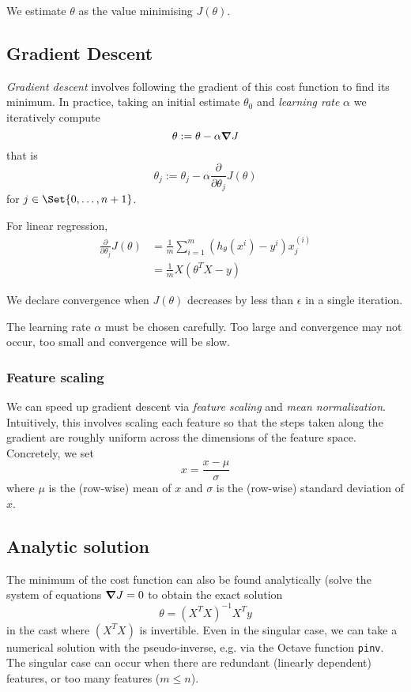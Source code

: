 \documentclass[a4paper,12pt]{article}
\theoremstyle{definition}
\newcommand{\gv}[1]{\ensuremath{\mbox{\boldmath$ #1 $}}} %
\newcommand{\grad}[1]{\gv{\nabla} #1} %
\begin{document}
We estimate $\theta$ as the value minimising $J(\theta)$.

\subsection{Gradient Descent}
\emph{Gradient descent} involves following the gradient of this cost function to find its minimum. In practice, taking an initial estimate $\theta_0$ and \emph{learning rate} $\alpha$ we iteratively compute
\[
\theta := \theta - \alpha \grad J
\]
that is
\[
\theta_j := \theta_j - \alpha \frac{\partial}{\partial \theta_j} J(\theta)
\]
for $j \in \Set{0, \ldots, n+1}$.

For linear regression,
\begin{align*}
\frac{\partial}{\partial \theta_j} J(\theta) &= \frac{1}{m} \sum_{i=1}^{m}{ \left( h_{\theta}(x^{i}) - y^{i}\right) x^{(i)}_j } \\
&= \frac{1}{m} X (\theta^T X - y)
\end{align*}


We declare convergence when $J(\theta)$ decreases by less than $\epsilon$ in a single iteration.

The learning rate $\alpha$ must be chosen carefully. Too large and convergence may not occur, too small and convergence will be slow.

\subsubsection{Feature scaling}
We can speed up gradient descent via \emph{feature scaling} and \emph{mean normalization}. Intuitively, this involves scaling each feature so that the steps taken along the gradient are roughly uniform across the dimensions of the feature space. Concretely, we set
\[
x = \frac{x - \mu}{\sigma}
\]
where $\mu$ is the (row-wise) mean of $x$ and $\sigma$ is the (row-wise) standard deviation of $x$.

\subsection{Analytic solution}
The minimum of the cost function can also be found analytically (solve the system of equations $\grad J = 0$ to obtain the exact solution
\[
\theta = (X^T X)^{-1} X^T y
\]
in the cast where $(X^T X)$ is invertible. Even in the singular case, we can take a numerical solution with the pseudo-inverse, e.g. via the Octave function \verb!pinv!. The singular case can occur when there are redundant (linearly dependent) features, or too many features ($m \leq n$).
\end{document}
